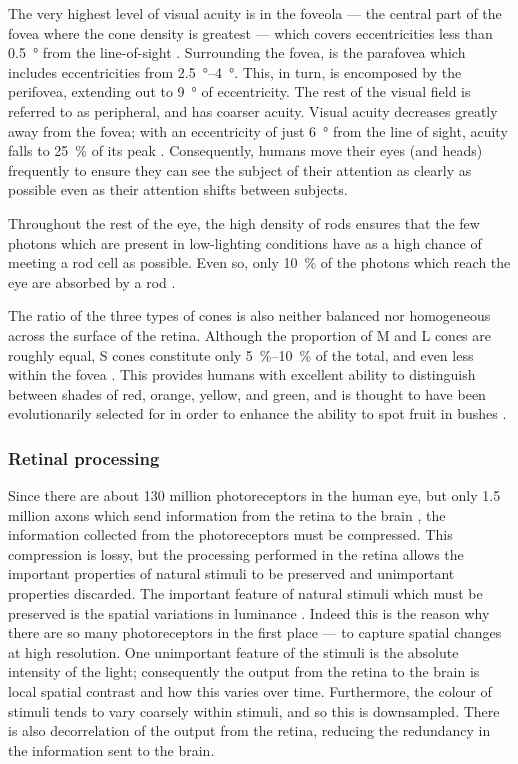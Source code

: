 The very highest level of visual acuity is in the foveola --- the central part of the fovea where the cone density is greatest --- which covers eccentricities less than \SI{0.5}{\degree} from the line-of-sight \citep{Hendrickson2005}.
Surrounding the fovea, is the parafovea which includes eccentricities from \SIrange{2.5}{4}{\degree}.
This, in turn, is encomposed by the perifovea, extending out to \SI{9}{\degree} of eccentricity.
The rest of the visual field is referred to as peripheral, and has coarser acuity.
Visual acuity decreases greatly away from the fovea; with an eccentricity of just \SI{6}{\degree} from the line of sight, acuity falls to \SI{25}{\percent} of its peak \citep[Chapter~11]{nsbook}.
Consequently, humans move their eyes (and heads) frequently to ensure they can see the subject of their attention as clearly as possible even as their attention shifts between subjects.

Throughout the rest of the eye, the high density of rods ensures that the few photons which are present in low-lighting conditions have as a high chance of meeting a rod cell as possible.
Even so, only \SI{10}{\percent} of the photons which reach the eye are absorbed by a rod \citep{Hecht1942}.

The ratio of the three types of cones is also neither balanced nor homogeneous across the surface of the retina.
Although the proportion of \ac{M} and \ac{L} cones are roughly equal, \ac{S} cones constitute only \SIrange{5}{10}{\percent} of the total, and even less within the fovea \citep[Chapter~11]{nsbook}.
This provides humans with excellent ability to distinguish between shades of red, orange, yellow, and green, and is thought to have been evolutionarily selected for in order to enhance the ability to spot fruit in bushes \citep{Bompas2013}.


\subsubsection{Retinal processing}
\label{sec:bg_retinal_processing}

Since there are about \num{130} million photoreceptors in the human eye, but only \num{1.5} million axons which send information from the retina to the brain \citep{Nassi2009}, the information collected from the photoreceptors must be compressed.
This compression is lossy, but the processing performed in the retina allows the important properties of natural stimuli to be preserved and unimportant properties discarded.
The important feature of natural stimuli which must be preserved is the spatial variations in luminance \citep[Chapter~11]{nsbook}.
Indeed this is the reason why there are so many photoreceptors in the first place --- to capture spatial changes at high resolution.
One unimportant feature of the stimuli is the absolute intensity of the light; consequently the output from the retina to the brain is local spatial contrast and how this varies over time.
Furthermore, the colour of stimuli tends to vary coarsely within stimuli, and so this is downsampled.
There is also decorrelation of the output from the retina, reducing the redundancy in the information sent to the brain.

